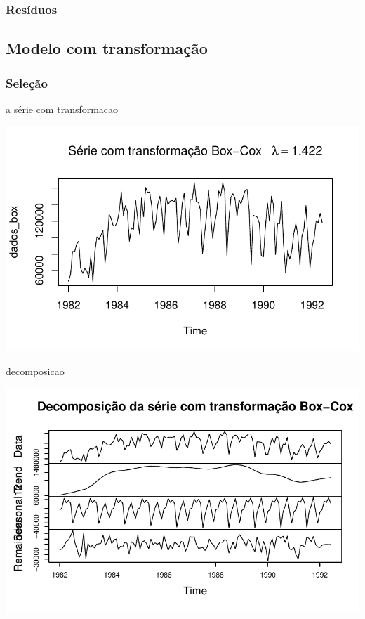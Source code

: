 \documentclass[
  letterpaper,
  DIV=11,
  numbers=noendperiod]{scrartcl}
\begin{document}
\hypertarget{resuxedduos}{%
\subsubsection{Resíduos}\label{resuxedduos}}

\hypertarget{modelo-com-transformauxe7uxe3o}{%
\subsection{Modelo com
transformação}\label{modelo-com-transformauxe7uxe3o}}

\hypertarget{seleuxe7uxe3o}{%
\subsubsection{Seleção}\label{seleuxe7uxe3o}}

a série com transformacao

\includegraphics{T2_grupo10_files/figure-pdf/ETS-com-transf-1.pdf}

decomposicao

\includegraphics{T2_grupo10_files/figure-pdf/decomposicao-ets-com-transformacao-1.pdf}
\end{document}
